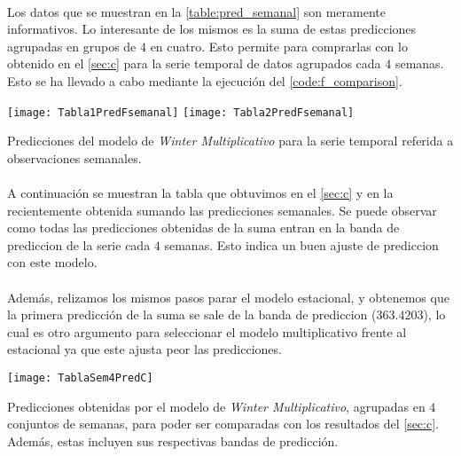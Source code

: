 \documentclass[a4paper, spanish]{article}
\begin{document}
    \paragraph{}
    Los datos que se muestran en la \ref{table:pred_semanal} son meramente informativos. Lo interesante de los mismos es la suma de estas predicciones agrupadas en grupos de $4$ en cuatro. Esto permite para comprarlas con lo obtenido en el \autoref{sec:c} para la serie temporal de datos agrupados cada $4$ semanas. Esto se ha llevado a cabo mediante la ejecución del \autoref{code:f_comparison}.

    \begin{table}[htb!]
      \centering
      \texttt{[image: Tabla1PredFsemanal]}
      \texttt{[image: Tabla2PredFsemanal]}
      \caption{Predicciones del modelo de \emph{Winter Multiplicativo} para la serie temporal referida a observaciones semanales.}
      \label{table:pred_semanal}
    \end{table}

    \paragraph{}
    A continuación se muestran la tabla que obtuvimos en el \autoref{sec:c} y en la recientemente obtenida sumando las predicciones semanales. Se puede observar como todas las predicciones obtenidas de la suma entran en la banda de prediccion de la serie cada $4$ semanas. Esto indica un buen ajuste de prediccion con este modelo.

    \paragraph{}
    Además, relizamos los mismos pasos parar el modelo estacional, y obtenemos que la primera predicción de la suma se sale de la banda de prediccion ($363.4203$), lo cual es otro argumento para seleccionar el modelo multiplicativo frente al estacional ya que este ajusta peor las predicciones.

    \begin{table}[htb!]
      \centering
      \texttt{[image: TablaSem4PredC]}
      \caption{Predicciones obtenidas por el modelo de \emph{Winter Multiplicativo}, agrupadas en $4$ conjuntos de semanas, para poder ser comparadas con los resultados del \autoref{sec:c}. Además, estas incluyen sus respectivas bandas de predicción.}
      \label{table:pred_semanal_4}
    \end{table}
\end{document}
